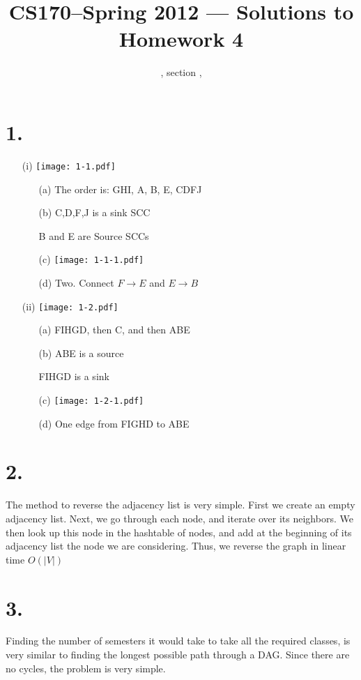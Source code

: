 \documentclass[11pt]{article}
\title{CS170--Spring 2012 --- Solutions to Homework 4}
\author{\Name, section \Sec, \texttt{\Login}}
\begin{document}
\maketitle

\section*{1.}

\begin{itemize}
\item[(i)]
\texttt{[image: 1-1.pdf]}
\begin{itemize}
\item[(a)]
The order is: GHI, A, B, E, CDFJ
\item[(b)]
C,D,F,J is a sink SCC

B and E are Source SCCs
\newpage
\item[(c)]
\texttt{[image: 1-1-1.pdf]}
\item[(d)]
Two. Connect $F \rightarrow E$ and $E\rightarrow B$
\end{itemize}
\item[(ii)]
\texttt{[image: 1-2.pdf]}
\begin{itemize}
\item[(a)]
FIHGD, then C, and then ABE
\item[(b)]
ABE is a source

FIHGD is a sink
\item[(c)]
\texttt{[image: 1-2-1.pdf]}
\item[(d)]
One edge from FIGHD to ABE
\end{itemize}
\end{itemize}
\newpage
\section*{2.}
The method to reverse the adjacency list is very simple. First we create an
empty adjacency list. Next, we go through each node, and iterate over its
neighbors. We then look up this node in the hashtable of nodes, and add at the
beginning of its adjacency list the node we are considering. Thus, we reverse
the graph in linear time $O(|V|)$
\newpage
\section*{3.}
Finding the number of semesters it would take to take all the required classes,
is very similar to finding the longest possible path through a DAG. Since there
are no cycles, the problem is very simple. 
\end{document}
